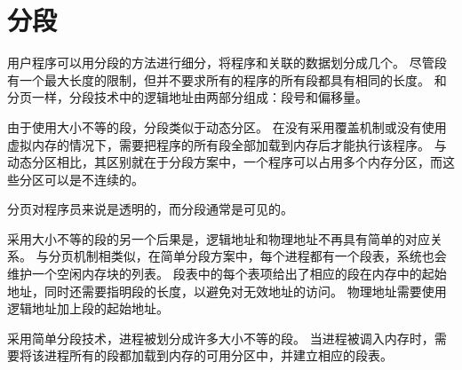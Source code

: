 
\section{分段}
{
    用户程序可以用分段的方法进行细分，将程序和关联的数据划分成几个。
    尽管段有一个最大长度的限制，但并不要求所有的程序的所有段都具有相同的长度。
    和分页一样，分段技术中的逻辑地址由两部分组成：段号和偏移量。

    由于使用大小不等的段，分段类似于动态分区。
    在没有采用覆盖机制或没有使用虚拟内存的情况下，需要把程序的所有段全部加载到内存后才能执行该程序。
    与动态分区相比，其区别就在于分段方案中，一个程序可以占用多个内存分区，而这些分区可以是不连续的。

    分页对程序员来说是透明的，而分段通常是可见的。

    采用大小不等的段的另一个后果是，逻辑地址和物理地址不再具有简单的对应关系。
    与分页机制相类似，在简单分段方案中，每个进程都有一个段表，系统也会维护一个空闲内存块的列表。
    段表中的每个表项给出了相应的段在内存中的起始地址，同时还需要指明段的长度，以避免对无效地址的访问。
    物理地址需要使用逻辑地址加上段的起始地址。

    采用简单分段技术，进程被划分成许多大小不等的段。
    当进程被调入内存时，需要将该进程所有的段都加载到内存的可用分区中，并建立相应的段表。
}

